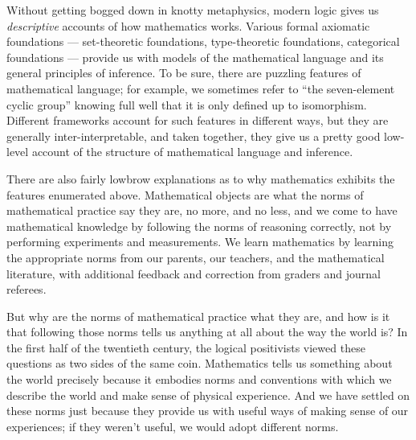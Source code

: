 \documentclass[11pt]{article}
\begin{document}
Without getting bogged down in knotty metaphysics, modern logic gives us \emph{descriptive} accounts of how mathematics works. Various formal axiomatic foundations --- set-theoretic foundations, type-theoretic foundations, categorical foundations --- provide us with models of the mathematical language and its general principles of inference. To be sure, there are puzzling features of mathematical language; for example, we sometimes refer to ``the seven-element cyclic group'' knowing full well that it is only defined up to isomorphism. Different frameworks account for such features in different ways, but they are generally inter-interpretable, and taken together, they give us a pretty good low-level account of the structure of mathematical language and inference.

There are also fairly lowbrow explanations as to why mathematics exhibits the features enumerated above. Mathematical objects are what the norms of mathematical practice say they are, no more, and no less, and we come to have mathematical knowledge by following the norms of reasoning correctly, not by performing experiments and measurements. We learn mathematics by learning the appropriate norms from our parents, our teachers, and the mathematical literature, with additional feedback and correction from graders and journal referees. 

But why are the norms of mathematical practice what they are, and how is it that following those norms tells us anything at all about the way the world is? In the first half of the twentieth century, the logical positivists viewed these questions as two sides of the same coin. Mathematics tells us something about the world precisely because it embodies norms and conventions with which we describe the world and make sense of physical experience. And we have settled on these norms just because they provide us with useful ways of making sense of our experiences; if they weren't useful, we would adopt different norms. 
\end{document}
